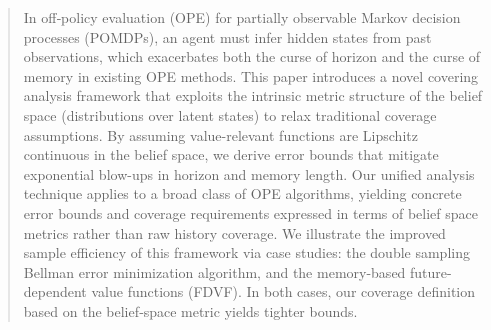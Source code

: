 \documentclass[twoside]{article}
\newcommand{\yplu}[1]{{\color{orange}{ [\textbf{Yiping:}} #1]}}
\begin{document}

%

%


\begin{abstract}
In off‑policy evaluation (OPE) for partially observable Markov decision processes (POMDPs), an agent must infer hidden states from past observations, which exacerbates both the curse of horizon and the curse of memory in existing OPE methods. This paper introduces a novel covering analysis framework that exploits the intrinsic metric structure of the belief space (distributions over latent states) to relax traditional coverage assumptions. By assuming value-relevant functions are Lipschitz continuous in the belief space,%
we derive error bounds that mitigate exponential blow-ups in horizon and memory length. Our unified analysis technique applies to a broad class of OPE algorithms, yielding concrete error bounds and coverage requirements expressed in terms of belief space metrics rather than raw history coverage. We illustrate the improved sample efficiency of this framework via case studies: the double sampling Bellman error minimization algorithm, and the memory-based future-dependent value functions (FDVF). In both cases, our coverage definition based on the belief‐space metric yields tighter bounds.
\end{abstract}

\end{document}
